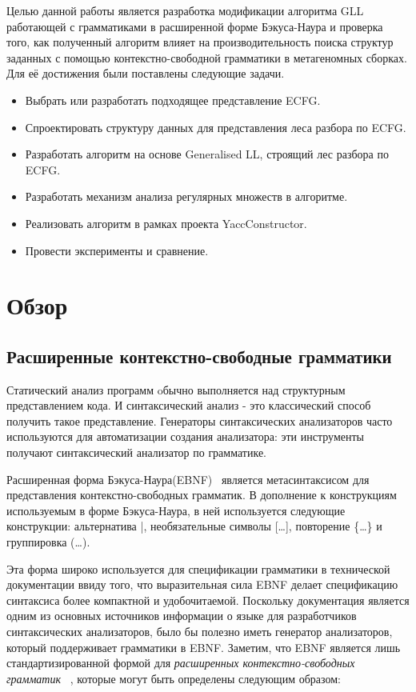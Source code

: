 \documentclass[14pt]{matmex-diploma-custom}
\begin{document}
	Целью данной работы является разработка модификации алгоритма GLL работающей с 
	грамматиками в расширенной форме Бэкуса-Наура и проверка того, как полученный 
	алгоритм влияет на производительность поиска структур заданных с помощью 
	контекстно-свободной грамматики в метагеномных сборках. Для её достижения были 
	поставлены следующие задачи.
	
	\begin{itemize}  
		\item Выбрать или разработать подходящее представление ECFG.
		\item Спроектировать структуру данных для представления леса разбора по ECFG.
		\item Разработать алгоритм на основе Generalised LL, строящий лес разбора по ECFG.
        \item Разработать механизм анализа регулярных множеств в алгоритме.
		\item Реализовать алгоритм в рамках проекта YaccConstructor.
		\item Провести эксперименты и сравнение.
	\end{itemize}
	
	\section{Обзор}
	
	\subsection{Расширенные контекстно-свободные грамматики}
	Статический анализ программ oбычно выполняется над структурным представлением кода. 
	И синтаксический анализ - это классический способ получить такое представление. Генераторы 
    синтаксических анализаторов часто используются для автоматизации создания анализатора: 
    эти инструменты получают синтаксический анализатор по грамматике.
	
	Расширенная форма Бэкуса-Наура(EBNF)~\cite{EBNFISO} является метасинтаксисом для представления 
	контекстно-свободных грамматик. В дополнение к конструкциям используемым в форме
	Бэкуса-Наура, в ней используется следующие конструкции: альтернатива |,
	необязательные символы [\dots], повторение \{\dots\} и группировка (\dots).
	
	Эта форма широко используется для спецификации грамматики в технической документации
	ввиду того, что выразительная сила EBNF делает спецификацию синтаксиса более компактной
	и удобочитаемой. Поскольку документация является одним из основных источников информации
	о языке для разработчиков синтаксических анализаторов, было бы полезно иметь генератор
	анализаторов, который поддерживает грамматики в EBNF. Заметим, что EBNF является 
	лишь стандартизированной формой для \textit{расширенных контекстно-свободных грамматик}
	~\cite{ECFG}, которые могут быть определены следующим образом:
	
\end{document}
